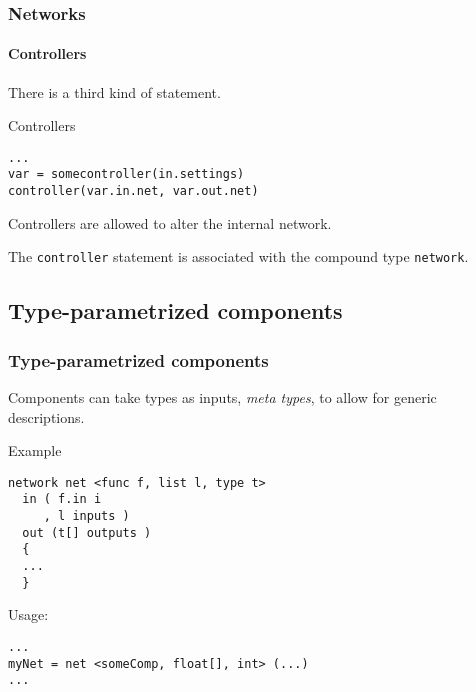 \begin{frame}[fragile]
\frametitle{Networks}
\framesubtitle{Controllers}

There is a third kind of statement.

\pause
\begin{block}{Controllers}
\begin{verbatim}
...
var = somecontroller(in.settings)
controller(var.in.net, var.out.net)
\end{verbatim}
\end{block}

\pause
Controllers are allowed to alter the internal network.
\vspace{10pt}

\pause
The \verb|controller| statement is associated with the compound type
\verb|network|.

\end{frame}


\subsection*{Type-parametrized components}
\begin{frame}[fragile]
\frametitle{Type-parametrized components}

Components can take types as inputs, \emph{meta types}, to allow for
generic descriptions.

\pause
\begin{block}{Example}
\begin{verbatim}
network net <func f, list l, type t>
  in ( f.in i
     , l inputs )
  out (t[] outputs )
  {
  ...
  }
\end{verbatim}
\end{block}

\pause
\begin{block}{Usage:}
\begin{verbatim}
...
myNet = net <someComp, float[], int> (...)
...
\end{verbatim}
\end{block}
\end{frame}
